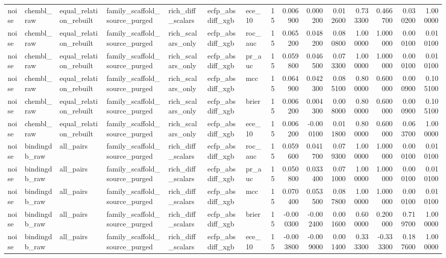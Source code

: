 \begin{longtable}{lllllllrrrrrrrr}
noise & chembl\_raw & equal\_relation\_rebuilt & family\_scaffold\_source\_purged & rich\_diff\_scalars & ecfp\_absdiff\_xgb & ece\_10 & 15 & 0.006900 & 0.000200 & 0.012600 & 0.733300 & 0.466700 & 0.030200 & 1.000000 \\
noise & chembl\_raw & equal\_relation\_rebuilt & family\_scaffold\_source\_purged & rich\_scalars\_only & ecfp\_absdiff\_xgb & roc\_auc & 15 & 0.065200 & 0.048200 & 0.080800 & 1.000000 & 1.000000 & 0.000100 & 0.010100 \\
noise & chembl\_raw & equal\_relation\_rebuilt & family\_scaffold\_source\_purged & rich\_scalars\_only & ecfp\_absdiff\_xgb & pr\_auc & 15 & 0.059800 & 0.046500 & 0.073300 & 1.000000 & 1.000000 & 0.000100 & 0.010100 \\
noise & chembl\_raw & equal\_relation\_rebuilt & family\_scaffold\_source\_purged & rich\_scalars\_only & ecfp\_absdiff\_xgb & mcc & 15 & 0.064900 & 0.042300 & 0.085100 & 0.800000 & 0.600000 & 0.000900 & 0.105100 \\
noise & chembl\_raw & equal\_relation\_rebuilt & family\_scaffold\_source\_purged & rich\_scalars\_only & ecfp\_absdiff\_xgb & brier & 15 & 0.006200 & 0.004300 & 0.008000 & 0.800000 & 0.600000 & 0.000900 & 0.105100 \\
noise & chembl\_raw & equal\_relation\_rebuilt & family\_scaffold\_source\_purged & rich\_scalars\_only & ecfp\_absdiff\_xgb & ece\_10 & 15 & 0.006200 & -0.000100 & 0.011800 & 0.800000 & 0.600000 & 0.063700 & 1.000000 \\
noise & bindingdb\_raw & all\_pairs & family\_scaffold\_source\_purged & rich\_diff\_scalars & ecfp\_absdiff\_xgb & roc\_auc & 15 & 0.059600 & 0.041700 & 0.079300 & 1.000000 & 1.000000 & 0.000100 & 0.010100 \\
noise & bindingdb\_raw & all\_pairs & family\_scaffold\_source\_purged & rich\_diff\_scalars & ecfp\_absdiff\_xgb & pr\_auc & 15 & 0.050800 & 0.033400 & 0.071000 & 1.000000 & 1.000000 & 0.000100 & 0.010100 \\
noise & bindingdb\_raw & all\_pairs & family\_scaffold\_source\_purged & rich\_diff\_scalars & ecfp\_absdiff\_xgb & mcc & 15 & 0.070400 & 0.053500 & 0.087800 & 1.000000 & 1.000000 & 0.000100 & 0.010100 \\
noise & bindingdb\_raw & all\_pairs & family\_scaffold\_source\_purged & rich\_diff\_scalars & ecfp\_absdiff\_xgb & brier & 15 & -0.000300 & -0.002400 & 0.001600 & 0.600000 & 0.200000 & 0.719700 & 1.000000 \\
noise & bindingdb\_raw & all\_pairs & family\_scaffold\_source\_purged & rich\_diff\_scalars & ecfp\_absdiff\_xgb & ece\_10 & 15 & -0.003800 & -0.009000 & 0.001400 & 0.333300 & -0.333300 & 0.187600 & 1.000000 \\

\end{longtable}
